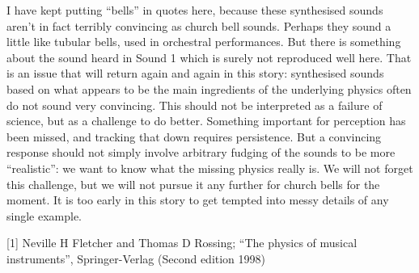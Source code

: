   I have kept putting ``bells'' in quotes here, because these synthesised 
  sounds aren't in fact terribly convincing as church bell sounds. Perhaps they 
  sound a little like tubular bells, used in orchestral performances. But there 
  is something about the sound heard in Sound 1 which is surely not reproduced 
  well here. That is an issue that will return again and again in this story: 
  synthesised sounds based on what appears to be the main ingredients of the 
  underlying physics often do not sound very convincing. This should not be 
  interpreted as a failure of science, but as a challenge to do better. 
  Something important for perception has been missed, and tracking that down 
  requires persistence. But a convincing response should not simply involve 
  arbitrary fudging of the sounds to be more ``realistic'': we want to know 
  what the missing physics really is. We will not forget this challenge, but we 
  will not pursue it any further for church bells for the moment. It is too 
  early in this story to get tempted into messy details of any single example. 



  \sectionreferences{}[1] Neville H Fletcher and Thomas D Rossing; ``The 
  physics of musical instruments'', Springer-Verlag (Second edition 1998) 